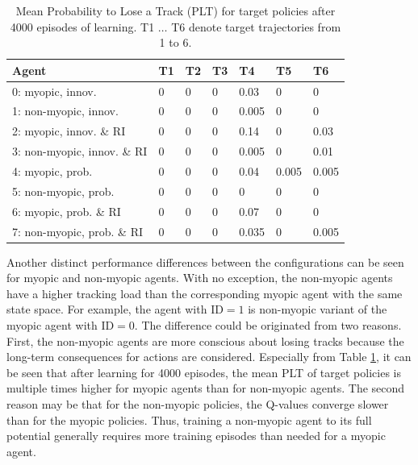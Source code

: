 \documentclass[english, 12pt, a4paper, elec, utf8, a-1b, online]{aaltothesis}
\numberwithin{equation}{section}
\begin{document}
\begin{table}[tb]
    \centering
    \begin{tabular}{|l|l|l|l|l|l|l|}
        \hline
        \textbf{Agent} & \textbf{T1} & \textbf{T2} & \textbf{T3} & \textbf{T4} & \textbf{T5} & \textbf{T6} \\ \hline
        0: myopic, innov. & 0 & 0 & 0 & 0.03  & 0     & 0     \\ \hline
        1: non-myopic, innov. & 0 & 0 & 0 & 0.005 & 0     & 0     \\ \hline
        2: myopic, innov. \& RI & 0 & 0 & 0 & 0.14  & 0     & 0.03  \\ \hline
        3: non-myopic, innov. \& RI & 0 & 0 & 0 & 0.005 & 0     & 0.01  \\ \hline
        4: myopic, prob. & 0 & 0 & 0 & 0.04  & 0.005 & 0.005 \\ \hline
        5: non-myopic, prob. & 0 & 0 & 0 & 0     & 0     & 0     \\ \hline
        6: myopic, prob. \& RI & 0 & 0 & 0 & 0.07  & 0     & 0     \\ \hline
        7: non-myopic, prob. \& RI & 0 & 0 & 0 & 0.035 & 0     & 0.005 \\ \hline
    \end{tabular}
    \caption{Mean Probability to Lose a Track (PLT) for target policies after 4000 episodes of learning. T1 $\ldots$ T6 denote target trajectories from 1 to 6.}
    \label{tab:plt_comparison}
\end{table}

Another distinct performance differences between the configurations can be seen for myopic and non-myopic agents.
With no exception, the non-myopic agents have a higher tracking load than the corresponding myopic agent with the same state space. 
For example, the agent with $\text{ID}=1$ is non-myopic variant of the myopic agent with $\text{ID}=0$.
The difference could be originated from two reasons.
First, the non-myopic agents are more conscious about losing tracks because the long-term consequences for actions are considered.
Especially from Table \ref{tab:plt_comparison}, it can be seen that after learning for 4000 episodes, the mean PLT of target policies is multiple times higher for myopic agents than for non-myopic agents.
The second reason may be that for the non-myopic policies, the Q-values converge slower than for the myopic policies.
Thus, training a non-myopic agent to its full potential generally requires more training episodes than needed for a myopic agent.
\end{document}
